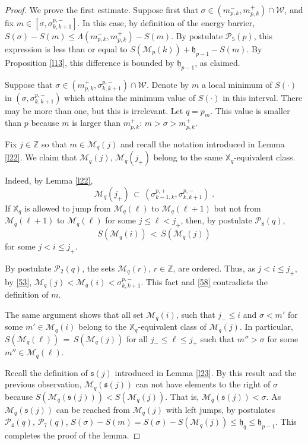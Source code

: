 \documentclass[reqno]{amsart}
\theoremstyle{plain}
\theoremstyle{definition}
\newcommand{\mc}[1]{{\mathcal #1}}
\newcommand{\mf}[1]{{\mathfrak #1}}
\newcommand{\bb}[1]{{\mathbb #1}}
\newcommand{\ms}[1]{{\mathscr #1}}
\newcounter{as}[section]
\newcommand{\<}{\langle}
\renewcommand{\>}{\rangle}
\begin{document}
\begin{proof}
We prove the first estimate.  Suppose first that
$\sigma \in (m^-_{p,k}, m^+_{p,k}) \cap \mc W$, and fix
$m\in [\sigma, \sigma^{p,-}_{k,k+1}]$. In this case, by definition of
the energy barrier,
$S(\sigma)-S(m) \le \Lambda (m^-_{p,k}, m^+_{p,k}) - S(m)$.  By
postulate $\mc P_5(p)$, this expression is less than or equal to
$S(\ms M_{p}(k)) + \mf h_{p-1} - S(m)$. By Proposition \ref{l13}, this
difference is bounded by $\mf h_{p-1}$, as claimed.

Suppose that $\sigma \in (m^+_{p,k}, \sigma^{p,-}_{k,k+1}) \cap \mc W$.
Denote by $m$ a local minimum of $S(\cdot)$ in
$(\sigma, \sigma^{p,-}_{k,k+1})$ which attains the minimum value of
$S(\cdot)$ in this interval. There may be more than one, but this is
irrelevant. Let $q=p_m$. This value is smaller than $p$ because $m$ is
larger than $m^+_{p,k}$: $m>\sigma>m^+_{p,k}$.

Fix $j\in \bb Z$ so that $m\in \ms M_{q}(j)$ and recall the notation
introduced in Lemma \ref{l22}.  We claim that $\ms M_{q}(j)$,
$\ms M_{q}(j_+)$ belong to the same $\bb X_q$-equivalent class.

Indeed, by Lemma \ref{l22},
\begin{equation}
\label{53}
\ms M_{q}(j_+) \,\subset\, (\sigma^{p,+}_{k-1,k},
\sigma^{p,-}_{k,k+1})\;.
\end{equation}
If $\bb X_q$ is allowed to jump from $\ms M_{q}(\ell)$ to
$\ms M_{q}(\ell+1)$ but not from $\ms M_{q}(\ell+1)$ to
$\ms M_{q}(\ell)$ for some $j\le \ell < j_+$, then, by postulate
$\mc P_8(q)$,
\begin{equation}
\label{58}
S(\ms M_{q}(i)) \,<\, S(\ms M_{q}(j))
\end{equation}
for some $j < i \le j_+$.

By postulate $\mc P_2(q)$, the sets $\ms M_{q}(r)$, $r\in \bb Z$, are
ordered. Thus, as $j < i \le j_+$, by \eqref{53},
$\ms M_{q}(j) < \ms M_{q}(i) < \sigma^{p,-}_{k,k+1}$.  This fact and
\eqref{58} contradicts the definition of $m$.

The same argument shows that all set $\ms M_{q}(i)$, such that
$j_- \le i$ and $\sigma < m'$ for some $m'\in \ms M_{q}(i)$ belong to
the $\bb X_q$-equivalent class of $\ms M_{q}(j)$.  In particular,
$S(\ms M_{q}(\ell)) \,=\, S(\ms M_{q}(j))$ for all
$j_- \le \ell \le j_+$ such that $m''>\sigma$ for some
$m''\in \ms M_{q}(\ell)$.

Recall the definition of $\mf s(j)$ introduced in Lemma \ref{l23}. By
this result and the previous observation, $\ms M_{q}(\mf s(j))$ can
not have elements to the right of $\sigma$ because
$S(\ms M_{q}(\mf s(j))) < S(\ms M_{q}(j))$. That is,
$\ms M_{q}(\mf s(j))<\sigma$.  As $\ms M_{q}(\mf s(j))$ can be reached
from $\ms M_{q}(j)$ with left jumps, by postulates $\mc P_4(q)$,
$\mc P_7(q)$,
$S(\sigma) - S(m) = S(\sigma) - S(\ms M_{q}(j)) \le \mf h_q \le \mf
h_{p-1}$. This completes the proof of the lemma.
\end{proof}
\end{document}
